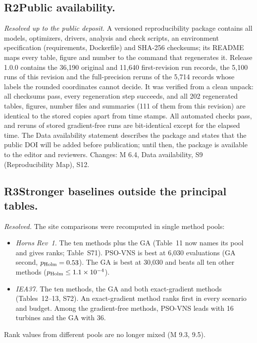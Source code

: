 \documentclass[11pt,a4paper]{article}
\newcommand{\concern}[2]{\subsection*{#1\quad #2}}
\begin{document}
\concern{R2}{Public availability.}
\emph{Resolved up to the public deposit.} A versioned reproducibility package contains all models, optimizers,
drivers, analysis and check scripts, an environment specification (requirements, Dockerfile) and SHA-256 checksums;
its README maps every table, figure and number to the command that regenerates it. Release 1.0.0 contains the
36,190 original and 11,640 first-revision run records, the 5,100 runs of this revision and the full-precision reruns of
the 5,714 records whose labels the rounded coordinates cannot decide. It was verified from a clean unpack: all checksums pass, every regeneration step succeeds, and all 202
regenerated tables, figures, number files and summaries (111 of them from this revision) are identical to the stored
copies apart from time stamps. All automated checks pass, and reruns of stored gradient-free runs are bit-identical
except for the elapsed time. The Data availability statement describes the package and states that the
public DOI will be added before publication; until then, the package is available to the editor and reviewers.
Changes: M 6.4, Data availability, S9 (Reproducibility Map), S12.

\concern{R3}{Stronger baselines outside the principal tables.}
\emph{Resolved.} The site comparisons were recomputed in single method pools:
\begin{itemize}
\item \emph{Horns Rev~1.} The ten methods plus the GA (Table~11 now names its pool and gives ranks; Table~S71).
PSO-VNS is best at 6,030 evaluations (GA second, $p_{\rm Holm}=0.53$). The GA is best at 30,030 and beats all ten
other methods ($p_{\rm Holm}\le1.1\times10^{-4}$).
\item \emph{IEA37.} The ten methods, the GA and both exact-gradient methods (Tables~12--13, S72). An exact-gradient
method ranks first in every scenario and budget. Among the gradient-free methods, PSO-VNS leads with 16 turbines and
the GA with 36.
\end{itemize}
Rank values from different pools are no longer mixed (M 9.3, 9.5).
\end{document}
